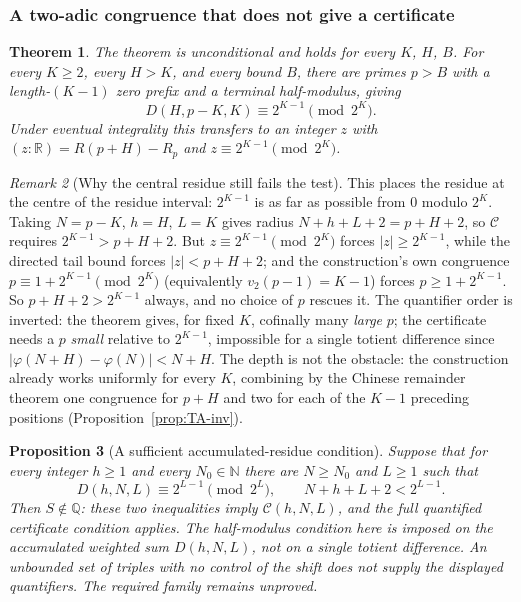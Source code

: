 \documentclass[11pt]{article}
\theoremstyle{plain}
\newtheorem{thm}{Theorem}[section]
\newtheorem{prop}[thm]{Proposition}
\theoremstyle{definition}
\theoremstyle{remark}
\newtheorem{rem}[thm]{Remark}
\begin{document}
\subsubsection{A two-adic congruence that does not give a certificate}

\begin{thm}\label{thm:two-adic-congruence-that-does}
The theorem is unconditional and holds for \emph{every} $K$, $H$, $B$.
For every $K\ge 2$, every $H>K$, and every bound $B$, there are primes
$p>B$ with a length-$(K{-}1)$ zero prefix and a terminal half-modulus, giving
\[
  D(H,p-K,K) \equiv 2^{K-1} \pmod{2^K}.
\]
Under eventual integrality this transfers to an integer $z$ with $(z:\mathbb R) =
{R}(p{+}H) - R_{p}$ and $z\equiv 2^{K-1}\pmod{2^K}$.
\end{thm}

\begin{rem}[Why the central residue still fails the test]
This places the residue at the centre of the residue interval: $2^{K-1}$ is
as far as possible from $0$ modulo $2^K$. Taking $N{=}p{-}K$,
$h{=}H$, $L{=}K$ gives radius $N{+}h{+}L{+}2 = p{+}H{+}2$, so $\mathcal{C}$ requires
$2^{K-1} > p{+}H{+}2$. But $z\equiv 2^{K-1}\pmod{2^K}$ forces $|z|\ge 2^{K-1}$, while the directed
tail bound forces $|z| < p{+}H{+}2$; and the construction's own congruence
$p\equiv 1{+}2^{K-1}\pmod{2^K}$ (equivalently $v_2(p{-}1)=K{-}1$) forces $p\ge 1{+}2^{K-1}$. So
$p{+}H{+}2 > 2^{K-1}$ always, and no choice of $p$ rescues it. The quantifier order is inverted:
the theorem gives, for fixed $K$, cofinally many \emph{large} $p$; the certificate needs a $p$
\emph{small} relative to $2^{K-1}$, impossible for a single totient
difference since $|\varphi(N{+}H)-\varphi(N)| < N{+}H$. The depth is not the
obstacle: the construction already works uniformly for every $K$,
combining by the Chinese remainder theorem one congruence for $p+H$ and
two for each of the $K-1$ preceding positions
(Proposition~\ref{prop:TA-inv}).
\end{rem}

\begin{prop}[A sufficient accumulated-residue condition]\label{prop:sufficient-accumulated-residue-condition}
Suppose that for every integer $h\ge1$ and every $N_0\in\mathbb N$
there are $N\ge N_0$ and $L\ge1$ such that
\[
 D(h,N,L)\equiv2^{L-1}\pmod{2^L},\qquad
 N+h+L+2<2^{L-1}.
\]
Then $S\notin\mathbb Q$: these two inequalities imply
$\mathcal C(h,N,L)$, and the full quantified certificate condition
applies. The half-modulus condition here is imposed on the accumulated
weighted sum $D(h,N,L)$, not on a single totient difference.
An unbounded set of triples with no control of the shift does not
supply the displayed quantifiers. The required family remains unproved.
\end{prop}
\end{document}
